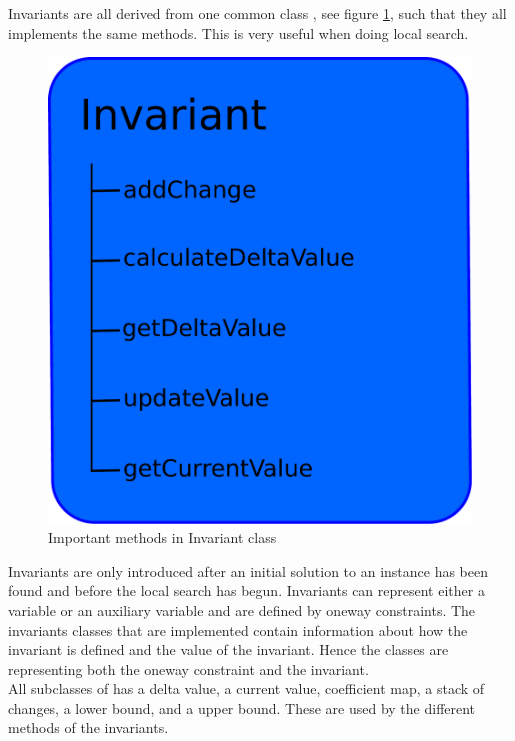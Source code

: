 Invariants are all derived from one common class , see figure \ref{fig_invariant}, such that they 
all implements the same methods. This is very useful when doing local search. 
\begin{figure}[!b]
\begin{center}
 \includegraphics[width=\linewidth/2]{invariant.pdf} \caption{Important methods in Invariant 
class}\label{fig_invariant}
\end{center} 
\end{figure}
Invariants are only introduced after an initial solution to an instance has been found and before the local 
search has begun. Invariants can represent either a variable or an auxiliary variable and are defined by oneway 
constraints. The invariants classes that are implemented contain information about how the invariant is defined and the 
value of the invariant. Hence the  classes are representing both the oneway constraint and the 
invariant. \\ 
All subclasses of  has a delta value, a current value, coefficient map, a stack of changes, a lower 
bound, and a upper bound. These are used by the different methods of the invariants. \\
